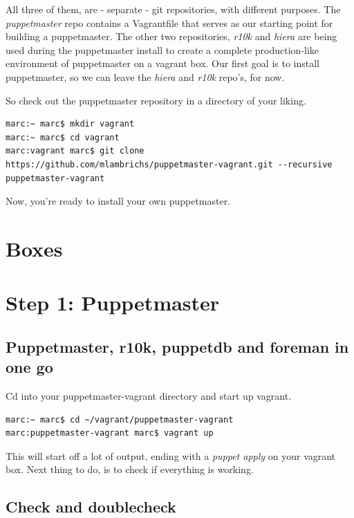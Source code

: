 \documentclass{article}
\begin{document}
\par All three of them, are - separate - git repositories, with different purposes. The \emph{puppetmaster} repo contains a Vagrantfile that serves as our starting point for building a puppetmaster. The other two repositories, \emph{r10k} and \emph{hiera} are being used during the puppetmaster install to create a complete production-like environment of puppetmaster on a vagrant box. Our first goal is to install puppetmaster, so we can leave the \emph{hiera} and \emph{r10k} repo's, for now.

\par So check out the puppetmaster repository in a directory of your liking.

\begin{verbatim}
marc:~ marc$ mkdir vagrant
marc:~ marc$ cd vagrant
marc:vagrant marc$ git clone https://github.com/mlambrichs/puppetmaster-vagrant.git --recursive puppetmaster-vagrant
\end{verbatim}

\par Now, you're ready to install your own puppetmaster.

\section{Boxes}

\section{Step 1: Puppetmaster}

\subsection{Puppetmaster, r10k, puppetdb and foreman in one go}
Cd into your puppetmaster-vagrant directory and start up vagrant.

\begin{verbatim}
marc:~ marc$ cd ~/vagrant/puppetmaster-vagrant
marc:puppetmaster-vagrant marc$ vagrant up
\end{verbatim}

This will start off a lot of output, ending with a \emph{puppet apply} on your vagrant box. Next thing to do, is to check if everything is working.

\subsection{Check and doublecheck}
\end{document}
